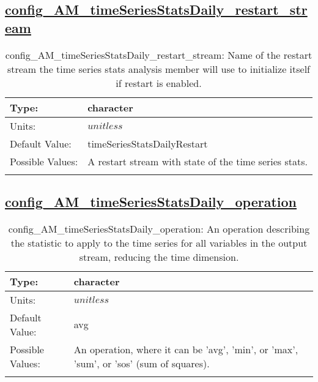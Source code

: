 \subsection[config\_AM\_timeSeriesStatsDaily\_restart\_stream]{\hyperref[sec:nm_tab_AM_timeSeriesStatsDaily]{config\_AM\_timeSeriesStatsDaily\_restart\_stream}}
\label{subsec:nm_sec_config_AM_timeSeriesStatsDaily_restart_stream}
\begin{center}
\begin{longtable}{| p{2.0in} || p{4.0in} |}
    \hline
    Type: & character \\
    \hline
    Units: & $unitless$ \\
    \hline
    Default Value: & timeSeriesStatsDailyRestart \\
    \hline
    Possible Values: & A restart stream with state of the time series stats. \\
    \hline
    \caption{config\_AM\_timeSeriesStatsDaily\_restart\_stream: Name of the restart stream the time series stats analysis member will use to initialize itself if restart is enabled.}
\end{longtable}
\end{center}
\subsection[config\_AM\_timeSeriesStatsDaily\_operation]{\hyperref[sec:nm_tab_AM_timeSeriesStatsDaily]{config\_AM\_timeSeriesStatsDaily\_operation}}
\label{subsec:nm_sec_config_AM_timeSeriesStatsDaily_operation}
\begin{center}
\begin{longtable}{| p{2.0in} || p{4.0in} |}
    \hline
    Type: & character \\
    \hline
    Units: & $unitless$ \\
    \hline
    Default Value: & avg \\
    \hline
    Possible Values: & An operation, where it can be 'avg', 'min', or 'max', 'sum', or 'sos' (sum of squares). \\
    \hline
    \caption{config\_AM\_timeSeriesStatsDaily\_operation: An operation describing the statistic to apply to the time series for all variables in the output stream, reducing the time dimension.}
\end{longtable}
\end{center}
